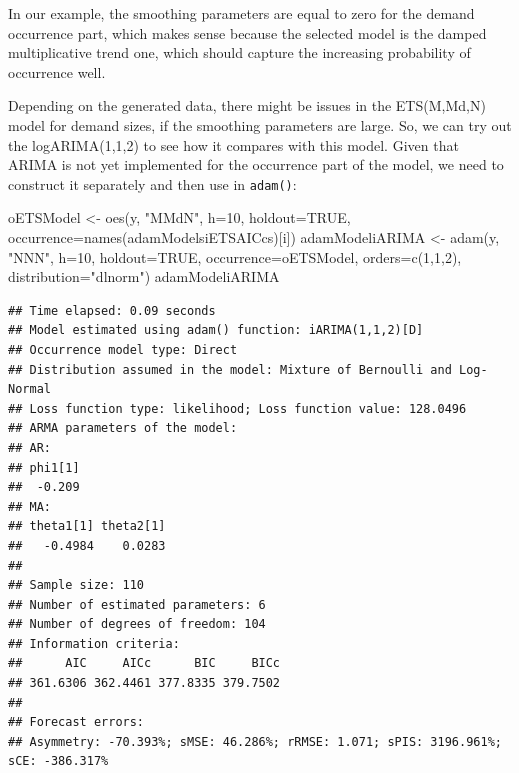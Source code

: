 \documentclass[
]{book}
\newenvironment{Shaded}{\begin{snugshade}}{\end{snugshade}}
\newcommand{\AttributeTok}[1]{\textcolor[rgb]{0.77,0.63,0.00}{#1}}
\newcommand{\ConstantTok}[1]{\textcolor[rgb]{0.00,0.00,0.00}{#1}}
\newcommand{\DecValTok}[1]{\textcolor[rgb]{0.00,0.00,0.81}{#1}}
\newcommand{\FunctionTok}[1]{\textcolor[rgb]{0.00,0.00,0.00}{#1}}
\newcommand{\NormalTok}[1]{#1}
\newcommand{\OtherTok}[1]{\textcolor[rgb]{0.56,0.35,0.01}{#1}}
\newcommand{\StringTok}[1]{\textcolor[rgb]{0.31,0.60,0.02}{#1}}
\theoremstyle{definition}
\theoremstyle{definition}
\theoremstyle{definition}
\theoremstyle{definition}
\theoremstyle{remark}
\begin{document}
In our example, the smoothing parameters are equal to zero for the demand occurrence part, which makes sense because the selected model is the damped multiplicative trend one, which should capture the increasing probability of occurrence well.

Depending on the generated data, there might be issues in the ETS(M,Md,N) model for demand sizes, if the smoothing parameters are large. So, we can try out the logARIMA(1,1,2) to see how it compares with this model. Given that ARIMA is not yet implemented for the occurrence part of the model, we need to construct it separately and then use in \texttt{adam()}:

\begin{Shaded}
\begin{Highlighting}[]
\NormalTok{oETSModel }\OtherTok{\textless{}{-}} \FunctionTok{oes}\NormalTok{(y, }\StringTok{"MMdN"}\NormalTok{, }\AttributeTok{h=}\DecValTok{10}\NormalTok{, }\AttributeTok{holdout=}\ConstantTok{TRUE}\NormalTok{,}
                 \AttributeTok{occurrence=}\FunctionTok{names}\NormalTok{(adamModelsiETSAICcs)[i])}
\NormalTok{adamModeliARIMA }\OtherTok{\textless{}{-}} \FunctionTok{adam}\NormalTok{(y, }\StringTok{"NNN"}\NormalTok{, }\AttributeTok{h=}\DecValTok{10}\NormalTok{, }\AttributeTok{holdout=}\ConstantTok{TRUE}\NormalTok{,}
                        \AttributeTok{occurrence=}\NormalTok{oETSModel,}
                        \AttributeTok{orders=}\FunctionTok{c}\NormalTok{(}\DecValTok{1}\NormalTok{,}\DecValTok{1}\NormalTok{,}\DecValTok{2}\NormalTok{),}
                        \AttributeTok{distribution=}\StringTok{"dlnorm"}\NormalTok{)}
\NormalTok{adamModeliARIMA}
\end{Highlighting}
\end{Shaded}

\begin{verbatim}
## Time elapsed: 0.09 seconds
## Model estimated using adam() function: iARIMA(1,1,2)[D]
## Occurrence model type: Direct
## Distribution assumed in the model: Mixture of Bernoulli and Log-Normal
## Loss function type: likelihood; Loss function value: 128.0496
## ARMA parameters of the model:
## AR:
## phi1[1] 
##  -0.209 
## MA:
## theta1[1] theta2[1] 
##   -0.4984    0.0283 
## 
## Sample size: 110
## Number of estimated parameters: 6
## Number of degrees of freedom: 104
## Information criteria:
##      AIC     AICc      BIC     BICc 
## 361.6306 362.4461 377.8335 379.7502 
## 
## Forecast errors:
## Asymmetry: -70.393%; sMSE: 46.286%; rRMSE: 1.071; sPIS: 3196.961%; sCE: -386.317%
\end{verbatim}
\end{document}
